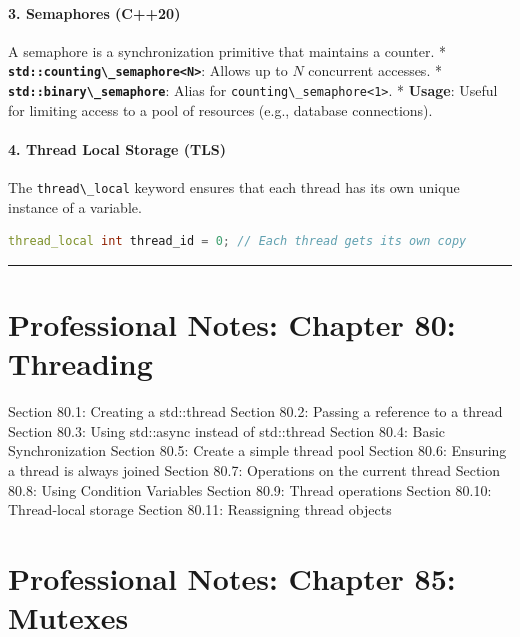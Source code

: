 \hypertarget{semaphores-c20}{%
\paragraph{3. Semaphores (C++20)}\label{semaphores-c20}}

A semaphore is a synchronization primitive that maintains a counter. *
\textbf{\passthrough{\lstinline!std::counting\_semaphore<N>!}}: Allows
up to \(N\) concurrent accesses. *
\textbf{\passthrough{\lstinline!std::binary\_semaphore!}}: Alias for
\passthrough{\lstinline!counting\_semaphore<1>!}. * \textbf{Usage}:
Useful for limiting access to a pool of resources (e.g., database
connections).

\hypertarget{thread-local-storage-tls}{%
\paragraph{4. Thread Local Storage
(TLS)}\label{thread-local-storage-tls}}

The \passthrough{\lstinline!thread\_local!} keyword ensures that each
thread has its own unique instance of a variable.

\begin{lstlisting}[language={C++}]
thread_local int thread_id = 0; // Each thread gets its own copy
\end{lstlisting}

\begin{center}\rule{0.5\linewidth}{0.5pt}\end{center}

\hypertarget{professional-notes-chapter-80-threading}{%
\section{Professional Notes: Chapter 80:
Threading}\label{professional-notes-chapter-80-threading}}

Section 80.1: Creating a std::thread Section 80.2: Passing a reference
to a thread Section 80.3: Using std::async instead of std::thread
Section 80.4: Basic Synchronization Section 80.5: Create a simple thread
pool Section 80.6: Ensuring a thread is always joined Section 80.7:
Operations on the current thread Section 80.8: Using Condition Variables
Section 80.9: Thread operations Section 80.10: Thread-local storage
Section 80.11: Reassigning thread objects

\hypertarget{professional-notes-chapter-85-mutexes}{%
\section{Professional Notes: Chapter 85:
Mutexes}\label{professional-notes-chapter-85-mutexes}}

